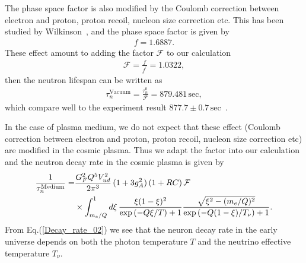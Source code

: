 The phase space factor is also modified by the Coulomb correction between electron and proton, proton recoil, nucleon size correction etc. This has been studied by Wilkinson~\cite{Wilkinson:1982hu}, and the phase space factor is given by~\cite{Czarnecki:2018okw,Czarnecki:2004cw,Wilkinson:1982hu}
\begin{align}
f=1.6887.
\end{align}
These effect amount to adding the factor $\mathcal{F}$ to our calculation
\begin{align}
\mathcal{F}=\frac{f}{f^\prime}=1.0322,
\end{align}
then the neutron lifespan can be written as 
\begin{align}
\tau^{\mathrm{Vacuum}}_n=\frac{\tau^0_n}{\mathcal{F}}=879.481\,\mathrm{sec},
\end{align}
which compare well to the experiment result $877.7\pm0.7\,\mathrm{sec}$~\cite{Pattie:2017vsj}. 

In the case of plasma medium, we do not expect that these effect (Coulomb correction between electron and proton, proton recoil, nucleon size correction etc) are modified in the cosmic plasma. Thus we adapt the factor into our calculation and the neutron decay rate in the cosmic plasma is given by
\begin{align}
\label{Decay_rate_02}
\frac{1}{\tau_n^{\mathrm{Medium}}}=&\frac{G^2_FQ^5V^2_{ud}}{2\pi^3}\,(1+3g^2_A)\,(1+RC)\,\mathcal{F}\\
&\times\int^1_{m_e/Q}d\xi\,\frac{\xi(1-\xi)^2}{\exp\left(-Q\xi/{T}\right)+1}\frac{\sqrt{\xi^2-(m_e/Q)^2}}{\exp\left(-Q(1-\xi)/T_\nu\right)+1}.\notag
\end{align}
From Eq.(\ref{Decay_rate_02}) we see that the neuron decay rate in the early universe depends on both the photon temperature $T$ and the neutrino effective temperature $T_\nu$.

